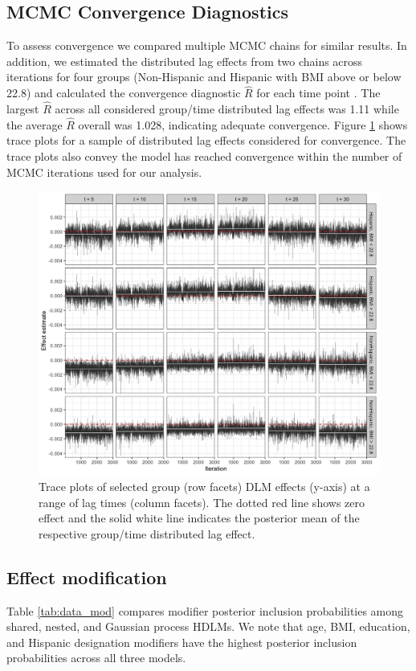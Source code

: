 \documentclass[12pt]{article}
\begin{document}
\subsection{MCMC Convergence Diagnostics}
To assess convergence we compared multiple MCMC chains for similar results. In addition, we estimated the distributed lag effects from two chains across iterations for four groups (Non-Hispanic and Hispanic with BMI above or below 22.8) and calculated the convergence diagnostic $\hat{R}$ for each time point \citep{Gelman1992InferenceSequences}. The largest $\hat{R}$ across all considered group/time distributed lag effects was 1.11 while the average $\hat{R}$ overall was 1.028, indicating adequate convergence. Figure \ref{fig:trace} shows trace plots for a sample of distributed lag effects considered for convergence. The trace plots also convey the model has reached convergence within the number of MCMC iterations used for our analysis.

\begin{figure}[!ht]
    \centering
    \includegraphics[width=\textwidth]{supp-img/dlm_traceplots.png}
    \caption{Trace plots of selected group (row facets) DLM effects (y-axis) at a range of lag times (column facets). The dotted red line shows zero effect and the solid white line indicates the posterior mean of the respective group/time distributed lag effect.}
    \label{fig:trace}
\end{figure}




\subsection{Effect modification}
Table \ref{tab:data_mod} compares modifier posterior inclusion probabilities among shared, nested, and Gaussian process HDLMs. We note that age, BMI, education, and Hispanic designation modifiers have the highest posterior inclusion probabilities across all three models.
\end{document}
